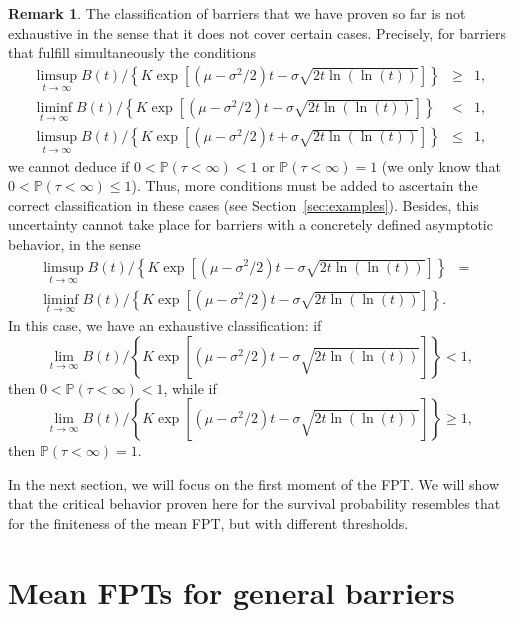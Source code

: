 \documentclass[12pt]{article}
\theoremstyle{definition}
\newtheorem{remark}{Remark}[theorem]
\begin{document}
\begin{remark}
\label{rem:undecidable_cases}
The classification of barriers that we have proven so far is not exhaustive in the sense that it does not cover certain cases. Precisely, for barriers that fulfill simultaneously the conditions
\begin{eqnarray}\nonumber
\limsup_{t \to \infty} B(t) \Big/ \left\{ K \exp \left[(\mu-\sigma^2/2)t - \sigma \sqrt{2t \ln(\ln(t))}\right] \right\} &\ge& 1, \\ \nonumber
\liminf_{t \to \infty} B(t) \Big/ \left\{ K \exp \left[(\mu-\sigma^2/2)t - \sigma \sqrt{2t \ln(\ln(t))}\right] \right\} &<& 1, \\ \nonumber
\limsup_{t \to \infty} B(t) \Big/ \left\{ K \exp \left[(\mu-\sigma^2/2)t + \sigma \sqrt{2t \ln(\ln(t))}\right] \right\} &\le& 1,
\end{eqnarray}
we cannot deduce if $0 < \mathbb{P}(\tau < \infty) < 1$ or $\mathbb{P}(\tau < \infty)=1$ (we only know that $0 < \mathbb{P}(\tau < \infty) \le 1$). Thus, more conditions must be added to ascertain the correct classification in these cases (see Section~\ref{sec:examples}). Besides, this uncertainty cannot take place for barriers with a concretely defined asymptotic behavior, in the sense 
\begin{eqnarray}\nonumber
\limsup_{t \to \infty} B(t) \Big/ \left\{ K \exp \left[(\mu-\sigma^2/2)t - \sigma \sqrt{2t \ln(\ln(t))}\right] \right\} &=& \\ \nonumber
\liminf_{t \to \infty} B(t) \Big/ \left\{ K \exp \left[(\mu-\sigma^2/2)t - \sigma \sqrt{2t \ln(\ln(t))}\right] \right\}. &&
\end{eqnarray}
In this case, we have an exhaustive classification: if
$$
\lim_{t \to \infty} B(t) \Big/ \left\{ K \exp \left[(\mu-\sigma^2/2)t - \sigma \sqrt{2t \ln(\ln(t))}\right] \right\} < 1,
$$
then $0<\mathbb{P}(\tau < \infty) < 1$, while if
$$
\lim_{t \to \infty} B(t) \Big/ \left\{ K \exp \left[(\mu-\sigma^2/2)t - \sigma \sqrt{2t \ln(\ln(t))}\right] \right\} \ge 1,
$$
then $\mathbb{P}(\tau < \infty) = 1$.
\end{remark}

In the next section, we will focus on the first moment of the FPT. We will show that the critical behavior proven here for the survival probability resembles that for the finiteness of the mean FPT, but with different thresholds.

\section{Mean FPTs for general barriers}
\label{sec:mfpts}
\end{document}
